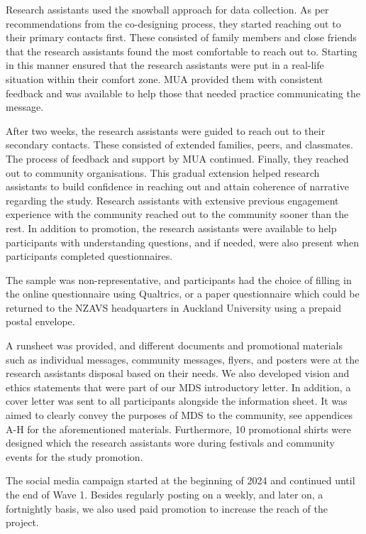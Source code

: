 \documentclass[
]{interact}
\begin{document}
Research assistants used the snowball approach for data collection. As
per recommendations from the co-designing process, they started reaching
out to their primary contacts first. These consisted of family members
and close friends that the research assistants found the most
comfortable to reach out to. Starting in this manner ensured that the
research assistants were put in a real-life situation within their
comfort zone. MUA provided them with consistent feedback and was
available to help those that needed practice communicating the message.

After two weeks, the research assistants were guided to reach out to
their secondary contacts. These consisted of extended families, peers,
and classmates. The process of feedback and support by MUA continued.
Finally, they reached out to community organisations. This gradual
extension helped research assistants to build confidence in reaching out
and attain coherence of narrative regarding the study. Research
assistants with extensive previous engagement experience with the
community reached out to the community sooner than the rest. In addition
to promotion, the research assistants were available to help
participants with understanding questions, and if needed, were also
present when participants completed questionnaires.

The sample was non-representative, and participants had the choice of
filling in the online questionnaire using Qualtrics, or a paper
questionnaire which could be returned to the NZAVS headquarters in
Auckland University using a prepaid postal envelope.

A runsheet was provided, and different documents and promotional
materials such as individual messages, community messages, flyers, and
posters were at the research assistants disposal based on their needs.
We also developed vision and ethics statements that were part of our MDS
introductory letter. In addition, a cover letter was sent to all
participants alongside the information sheet. It was aimed to clearly
convey the purposes of MDS to the community, see appendices A-H for the
aforementioned materials. Furthermore, 10 promotional shirts were
designed which the research assistants wore during festivals and
community events for the study promotion.

The social media campaign started at the beginning of 2024 and continued
until the end of Wave 1. Besides regularly posting on a weekly, and
later on, a fortnightly basis, we also used paid promotion to increase
the reach of the project.
\end{document}
